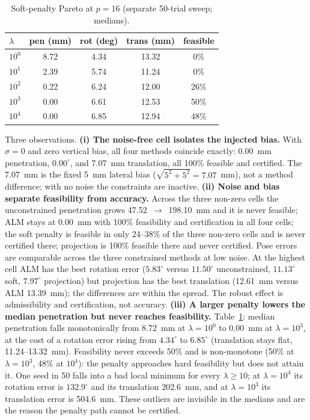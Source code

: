 \begin{table}[t]
\centering
\caption{Soft-penalty Pareto at $p=16$ (separate 50-trial sweep; medians).}
\label{tab:app_pareto}
\footnotesize
\begin{tabular}{@{}lcccc@{}}
\toprule
$\lambda$ & pen (mm) & rot (deg) & trans (mm) & feasible \\
\midrule
$10^0$ & 8.72 & 4.34 & 13.32 & 0\% \\
$10^1$ & 2.39 & 5.74 & 11.24 & 0\% \\
$10^2$ & 0.22 & 6.24 & 12.00 & 26\% \\
$10^3$ & 0.00 & 6.61 & 12.53 & 50\% \\
$10^4$ & 0.00 & 6.85 & 12.94 & 48\% \\
\bottomrule
\end{tabular}

\end{table}

Three observations. \textbf{(i) The noise-free cell isolates the injected bias.} With $\sigma=0$ and zero vertical bias, all four methods coincide exactly: 0.00~mm penetration, $0.00^\circ$, and 7.07~mm translation, all 100\% feasible and certified. The 7.07~mm is the fixed 5~mm lateral bias ($\sqrt{5^2+5^2}=7.07$~mm), not a method difference; with no noise the constraints are inactive. \textbf{(ii) Noise and bias separate feasibility from accuracy.} Across the three non-zero cells the unconstrained penetration grows 47.52~$\to$~198.10~mm and it is never feasible; ALM stays at 0.00~mm with 100\% feasibility and certification in all four cells; the soft penalty is feasible in only 24--38\% of the three non-zero cells and is never certified there; projection is 100\% feasible there and never certified. Pose errors are comparable across the three constrained methods at low noise. At the highest cell ALM has the best rotation error ($5.83^\circ$ versus $11.50^\circ$ unconstrained, $11.13^\circ$ soft, $7.97^\circ$ projection) but projection has the best translation (12.61~mm versus ALM 13.39~mm); the differences are within the spread. The robust effect is admissibility and certification, not accuracy. \textbf{(iii) A larger penalty lowers the median penetration but never reaches feasibility.} Table~\ref{tab:app_pareto}: median penetration falls monotonically from 8.72~mm at $\lambda=10^0$ to 0.00~mm at $\lambda=10^3$, at the cost of a rotation error rising from $4.34^\circ$ to $6.85^\circ$ (translation stays flat, 11.24--13.32~mm). Feasibility never exceeds 50\% and is non-monotone (50\% at $\lambda=10^3$, 48\% at $10^4$): the penalty approaches hard feasibility but does not attain it. One seed in 50 falls into a bad local minimum for every $\lambda\ge10$; at $\lambda=10^4$ its rotation error is $132.9^\circ$ and its translation 202.6~mm, and at $\lambda=10^3$ its translation error is 504.6~mm. These outliers are invisible in the medians and are the reason the penalty path cannot be certified.

